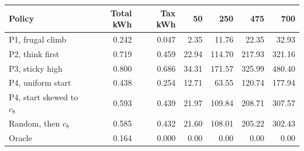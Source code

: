 \begin{tabular}{@{}lrrrrrr@{}}
\toprule
Policy & Total kWh & Tax kWh & 50 & 250 & 475 & 700 \\
\midrule
P1, frugal climb & 0.242 & 0.047 & 2.35 & 11.76 & 22.35 & 32.93 \\
P2, think first & 0.719 & 0.459 & 22.94 & 114.70 & 217.93 & 321.16 \\
P3, sticky high & 0.800 & 0.686 & 34.31 & 171.57 & 325.99 & 480.40 \\
P4, uniform start & 0.438 & 0.254 & 12.71 & 63.55 & 120.74 & 177.94 \\
P4, start skewed to $c_8$ & 0.593 & 0.439 & 21.97 & 109.84 & 208.71 & 307.57 \\
Random, then $c_8$ & 0.585 & 0.432 & 21.60 & 108.01 & 205.22 & 302.43 \\
Oracle & 0.164 & 0.000 & 0.00 & 0.00 & 0.00 & 0.00 \\
\bottomrule
\end{tabular}

